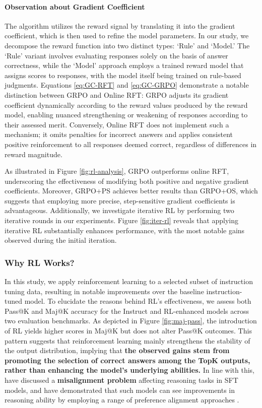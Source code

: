 \begin{itemize}[topsep=0pt]
\begin{itemize}[topsep=0pt]
\paragraph{Observation about Gradient Coefficient} The algorithm utilizes the reward signal by translating it into the gradient coefficient, which is then used to refine the model parameters. In our study, we decompose the reward function into two distinct types: `Rule' and `Model.' The `Rule' variant involves evaluating responses solely on the basis of answer correctness, while the `Model' approach employs a trained reward model that assigns scores to responses, with the model itself being trained on rule-based judgments. Equations \ref{eq:GC-RFT} and \ref{eq:GC-GRPO} demonstrate a notable distinction between GRPO and Online RFT: GRPO adjusts its gradient coefficient dynamically according to the reward values produced by the reward model, enabling nuanced strengthening or weakening of responses according to their assessed merit. Conversely, Online RFT does not implement such a mechanism; it omits penalties for incorrect answers and applies consistent positive reinforcement to all responses deemed correct, regardless of differences in reward magnitude.

As illustrated in Figure \ref{fig:rl-analysis}, GRPO outperforms online RFT, underscoring the effectiveness of modifying both positive and negative gradient coefficients. Moreover, GRPO+PS achieves better results than GRPO+OS, which suggests that employing more precise, step-sensitive gradient coefficients is advantageous. Additionally, we investigate iterative RL by performing two iterative rounds in our experiments. Figure \ref{fig:iter-rl} reveals that applying iterative RL substantially enhances performance, with the most notable gains observed during the initial iteration.

\subsubsection{Why RL Works?} In this study, we apply reinforcement learning to a selected subset of instruction tuning data, resulting in notable improvements over the baseline instruction-tuned model. To elucidate the reasons behind RL’s effectiveness, we assess both Pass@K and Maj@K accuracy for the Instruct and RL-enhanced models across two evaluation benchmarks. As depicted in Figure \ref{fig:maj-pass}, the introduction of RL yields higher scores in Maj@K but does not alter Pass@K outcomes. This pattern suggests that reinforcement learning mainly strengthens the stability of the output distribution, implying that \textbf{the observed gains stem from promoting the selection of correct answers among the TopK outputs, rather than enhancing the model’s underlying abilities.} In line with this, \citep{wang2023making} have discussed a \textbf{misalignment problem} affecting reasoning tasks in SFT models, and have demonstrated that such models can see improvements in reasoning ability by employing a range of preference alignment approaches \citep{yuan2023rrhf,song2023preference,wang2023making}.


\end{itemize}
\end{itemize}
